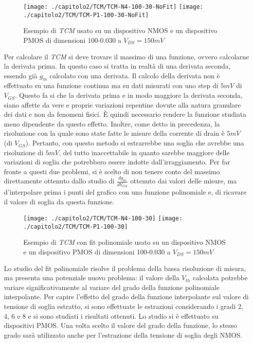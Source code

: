 \begin{figure}[h!]
  \centering
  \texttt{[image: ./capitolo2/TCM/TCM-N4-100-30-NoFit]}
  \texttt{[image: ./capitolo2/TCM/TCM-P1-100-30-NoFit]}
  \caption{Esempio di \emph{TCM} usato su un dispositivo NMOS e un dispositivo PMOS di dimensioni 100-0.030 a $V_{DS} = 150 mV$}
\end{figure}

Per calcolare il \emph{TCM} si deve trovare il massimo di una funzione, ovvero calcolarne la derivata prima. In questo caso si tratta in realtà di una derivata seconda, essendo già $g_m$ calcolato con una derivata. Il calcolo della derivata non è effettuato su una funzione continua ma su dati misurati con uno step di $5mV$ di $V_{GS}$. Questo fa si che la derivata prima e in modo maggiore la derivata seconda, siano affette da vere e proprie variazioni repentine dovute alla natura granulare dei dati e non da fenomeni fisici. È quindi necessario rendere la funzione studiata meno dipendente da questo effetto. Inoltre, come detto in precedenza, la risoluzione con la quale sono state fatte le misure della corrente di drain è $5mV$ (di $V_{GS}$). Pertanto, con questo metodo si estrarrebbe una soglia che avrebbe una risoluzione di $5mV$, del tutto inaccettabile in quanto sarebbe maggiore delle variazioni di soglia che potrebbero essere indotte dall'irraggiamento.
Per far fronte a questi due problemi, si è scelto di non tenere conto del massimo direttamente ottenuto dallo studio di $\frac{dg_m}{dV_{GS}}$ ottenuto dai valori delle misure, ma d'interpolare prima i punti del grafico con una funzione polinomiale e, di ricavare il valore di soglia da questa funzione.

\begin{figure}[H]
  \centering
  \texttt{[image: ./capitolo2/TCM/TCM-N4-100-30]}
  \texttt{[image: ./capitolo2/TCM/TCM-P1-100-30]}
  \caption{Esempio di \emph{TCM} con fit polinomiale usato su un dispositivo NMOS e un dispositivo PMOS di dimensioni 100-0.030 a $V_{DS} = 150 mV$}
\end{figure}

Lo studio del fit polinomiale risolve il problema della bassa risoluzione di misura, ma presenta una potenziale nuovo problema: il valore della $V_{th}$ calcolata potrebbe variare significativamente al variare del grado della funzione polinomiale interpolante. Per capire l'effetto del grado della funzione interpolante sul valore di tensione di soglia estratto, si sono effettuate le estrazioni considerando i gradi 2, 4, 6 e 8 e si sono studiati i risultati ottenuti. Lo studio si è effettuato su dispositivi PMOS. Una volta scelto il valore del grado della funzione, lo stesso grado sarà utilizzato anche per l'estrazione della tensione di soglia degli NMOS.

